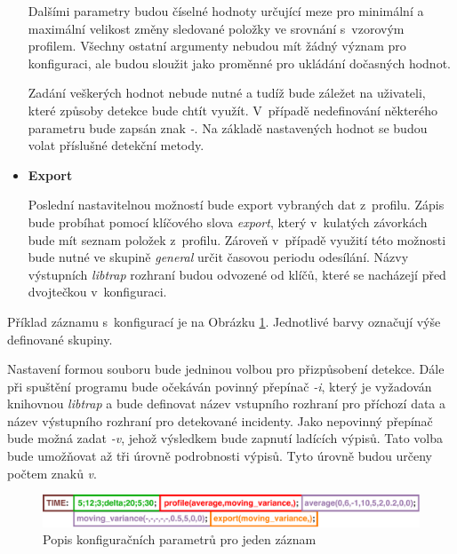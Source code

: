 \begin{itemize}
  Dalšími parametry budou číselné hodnoty určující meze pro minimální a maximální velikost 
  změny sledované položky ve srovnání s~vzorovým profilem. Všechny ostatní argumenty nebudou mít
  žádný význam pro konfiguraci, ale 
  budou sloužit jako proměnné pro ukládání dočasných hodnot.
  
  Zadání veškerých hodnot nebude nutné a tudíž bude záležet na uživateli, které způsoby detekce 
  bude chtít využít. V~případě nedefinování některého parametru bude zapsán znak \textit{-}.
  Na základě nastavených hodnot se budou volat příslušné detekční metody.
  
  \item \textbf{Export}
  
  Poslední nastavitelnou možností bude export vybraných dat z~profilu. Zápis bude probíhat pomocí 
  klíčového slova \textit{export}, který v~kulatých závorkách bude mít seznam položek z~profilu. Zároveň 
  v~případě využití této možnosti bude nutné ve skupině \textit{general} určit časovou periodu
  odesílání.
  Názvy výstupních \textit{libtrap} rozhraní
  budou odvozené od klíčů, které se nacházejí před dvojtečkou v~konfiguraci.
  
 \end{itemize}

 Příklad záznamu s~konfigurací je na Obrázku \ref{obr.config}. Jednotlivé barvy označují 
 výše definované skupiny. 
 
 Nastavení formou
 souboru bude jedninou volbou pro přizpůsobení detekce. Dále při 
 spuštění programu bude očekáván povinný přepínač \textit{-i}, který je vyžadován knihovnou 
 \textit{libtrap} a bude definovat název vstupního
 rozhraní pro příchozí data a název výstupního rozhraní pro detekované incidenty. Jako nepovinný přepínač
 bude možná zadat \textit{-v}, jehož výsledkem bude zapnutí ladících výpisů. Tato volba bude umožňovat 
 až tři úrovně podrobnosti výpisů. Tyto úrovně budou určeny počtem znaků \textit{v}.
 
   \begin{figure}[ht]
   \begin{center}
   \includegraphics[scale=0.6]{pictures/config-file-frame-mod}
   \caption{Popis konfiguračních parametrů pro jeden záznam}
   \label{obr.config}
   \end{center}
   \end{figure}
 
